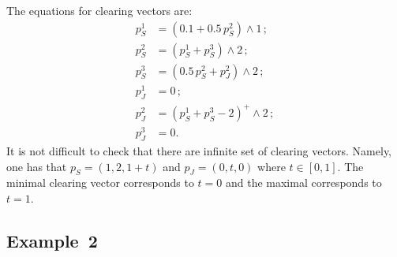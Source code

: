 \begin{multicols}{2}
The equations for clearing vectors are:
\begin{align*}
p_S^1 & =  \left(0.1+0.5\, p_S^2 \right)\wedge 1\,;\\
p_S^2 & =  \left(p_S^1+p_S^3 \right)\wedge 2\,;\\
p_S^3 & =  \left(0.5\, p_S^2+p_J^2\right)\wedge 2\,;\\
p_J^1 & = 0\,;\\
p_J^2 & = \left(p_S^1+p_S^3-2\right)^+\wedge 2\,;\\
p_J^3 & = 0.
\end{align*}
It is not difficult to check that there are infinite set of clearing vectors.
Namely, one has that $p_S=(1,2,1+t)$ and $p_J=(0,t,0)$ where $t\in [0,1]$.
The minimal clearing vector corresponds to $t=0$ and the maximal corresponds to 
$t=1$.

\subsection{Example~2}


\end{multicols}

